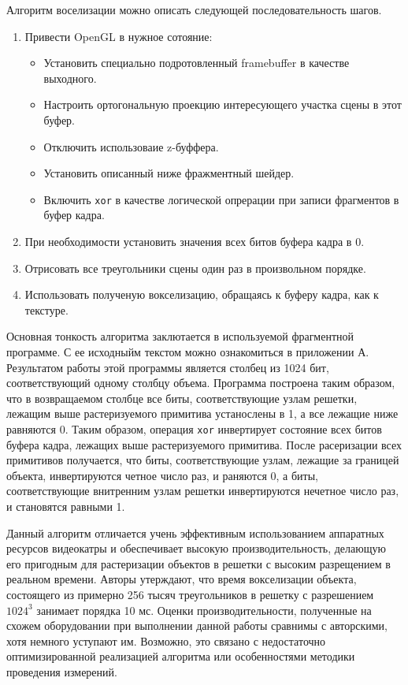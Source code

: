 Алгоритм воселизации можно описать следующей последовательность шагов.

\begin{enumerate}
\item Привести OpenGL в нужное сотояние:
\begin{itemize}
\item Установить специально подротовленный framebuffer в качестве выходного.
\item Настроить ортогональную проекцию интересующего участка сцены в этот буфер.
\item Отключить использоваие z-буффера.
\item Установить описанный ниже фражментный шейдер.
\item Включить \texttt{xor} в качестве логической опрерации при записи фрагментов в буфер кадра.
\end{itemize}
\item При необходимости установить значения всех битов буфера кадра в 0.
\item Отрисовать все треугольники сцены один раз в произвольном порядке.
\item Использовать полученую вокселизацию, обращаясь к буферу кадра, как к текстуре.
\end{enumerate}

Основная тонкость алгоритма заклютается в используемой фрагментной программе. С ее исходныйм текстом можно ознакомиться в приложении А. Результатом работы этой программы является столбец из 1024 бит, соответствующий одному столбцу объема. Программа построена таким образом, что в возвращаемом столбце все биты, соответствующие узлам решетки, лежащим выше растеризуемого примитива устанослены в 1, а все лежащие ниже равняются 0. Таким образом, операция \texttt{xor} инвертирует состояние всех битов буфера кадра, лежащих выше растеризуемого примитива. После расеризации всех примитивов получается, что биты, соответствующие узлам, лежащие за границей объекта, инвертируются четное число раз, и раняются 0, а биты, соответствующие внитренним узлам решетки инвертируются нечетное число раз, и становятся равными 1.

Данный алгоритм отличается учень эффективным использованием аппаратных ресурсов видеокатры и обеспечивает высокую производительность, делающую его пригодным для растеризации объектов в решетки с высоким разрещением в реальном времени. Авторы утерждают, что время вокселизации объекта, состоящего из примерно 256 тысяч треугольников в решетку с разрешением $1024^3$ занимает порядка 10 мс. Оценки производительности, полученные на схожем оборудовании при выполнении данной работы сравнимы с авторскими, хотя немного уступают им. Возможно, это связано с недостаточно оптимизированной реализацией алгоритма или особенностями методики проведения измерений.

